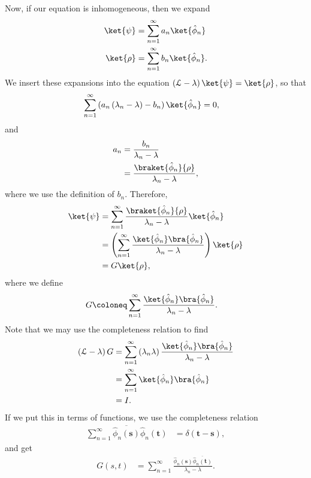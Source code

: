 \documentclass[10pt]{mypackage}
\begin{document}
  Now, if our equation is inhomogeneous, then we expand
  \begin{align*}
    \ket{\psi} &= \sum_{n=1}^{\infty}a_n\ket{\hat{\phi}_n}\\
    \ket{\rho} &= \sum_{n=1}^{\infty}b_n\ket{\hat{\phi}_n}.
  \end{align*}
  We insert these expansions into the equation $\left( \mathcal{L}-\lambda \right)\ket{\psi} = \ket{\rho}$, so that
  \begin{align*}
    \sum_{n=1}^{\infty}\left( a_n\left( \lambda_n-\lambda \right)-b_n \right)\ket{\hat{\phi}_n} &= 0,
  \end{align*}
  and
  \begin{align*}
    a_n &= \frac{b_n}{\lambda_n-\lambda}\\
        &= \frac{\braket{\hat{\phi}_n}{\rho}}{\lambda_n-\lambda},
  \end{align*}
  where we use the definition of $b_n$. Therefore,
  \begin{align*}
    \ket{\psi} &= \sum_{n=1}^{\infty}\frac{\braket{\hat{\phi}_n}{\rho}}{\lambda_n-\lambda}\ket{\hat{\phi}_n}\\
               &= \left( \sum_{n=1}^{\infty}\frac{\ket{\hat{\phi}_n}\bra{\hat{\phi}_n}}{\lambda_n-\lambda} \right)\ket{\rho}\\
               &= G\ket{\rho},
  \end{align*}
  where we define
  \begin{align*}
    G &\coloneq \sum_{n=1}^{\infty}\frac{\ket{\hat{\phi}_n}\bra{\hat{\phi}_n}}{\lambda_n-\lambda}.
  \end{align*}
  Note that we may use the completeness relation to find
  \begin{align*}
    \left( \mathcal{L}-\lambda \right)G &= \sum_{n=1}^{\infty}\left( \lambda_n\lambda \right) \frac{\ket{\hat{\phi}_n}\bra{\hat{\phi}_n}}{\lambda_n-\lambda}\\
                                        &= \sum_{n=1}^{\infty}\ket{\hat{\phi}_n}\bra{\hat{\phi}_n}\\
                                        &= I.
  \end{align*}
  If we put this in terms of functions, we use the completeness relation
  \begin{align*}
    \sum_{n=1}^{\infty} \overline{\hat{\phi}_n\left( \mathbf{s} \right)} \hat{\phi}_n(\mathbf{t}) &= \delta\left( \mathbf{t}-\mathbf{s} \right),
  \end{align*}
  and get
  \begin{align*}
    G\left( s,t \right) &= \sum_{n=1}^{\infty}\frac{\hat{\phi}_n\left( \mathbf{s} \right) \overline{\hat{\phi}_n\left( \mathbf{t} \right)}}{\lambda_n-\lambda}.
  \end{align*}
\end{document}
